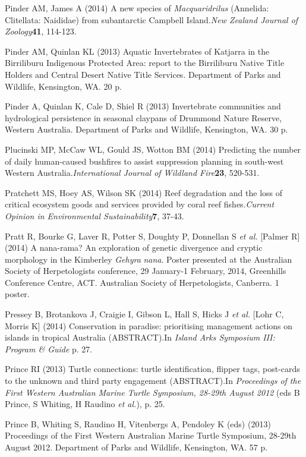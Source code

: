\documentclass[version=last, paper=a4, DIV=18, usenames, dvipsnames]{scrartcl}
\begin{document}
Pinder AM, James A (2014) A new species of \emph{Macquaridrilus} (Annelida: Clitellata: Naididae) from subantarctic Campbell Island.\emph{New Zealand Journal of Zoology}\textbf{41}, 114-123.


Pinder AM, Quinlan KL (2013) Aquatic Invertebrates of Katjarra in the Birriliburu Indigenous Protected Area: report to the Birriliburu Native Title Holders and Central Desert Native Title Services. Department of Parks and Wildlife, Kensington, WA. 20 p.


Pinder A, Quinlan K, Cale D, Shiel R (2013) Invertebrate communities and hydrological persistence in seasonal claypans of Drummond Nature Reserve, Western Australia. Department of Parks and Wildlife, Kensington, WA. 30 p.


Plucinski MP, McCaw WL, Gould JS, Wotton BM (2014) Predicting the number of daily human-caused bushfires to assist suppression planning in south-west Western Australia.\emph{International Journal of Wildland Fire}\textbf{23}, 520-531.


Pratchett MS, Hoey AS, Wilson SK (2014) Reef degradation and the loss of critical ecosystem goods and services provided by coral reef fishes.\emph{Current Opinion in Environmental Sustainability}\textbf{7}, 37-43.


Pratt R, Bourke G, Laver R, Potter S, Doughty P, Donnellan S \emph{et al.} [Palmer R] (2014) A nana-rama? An exploration of genetic divergence and cryptic morphology in the Kimberley \emph{Gehyra} \emph{nana}. Poster presented at the Australian Society of Herpetologists conference, 29 January-1 February, 2014, Greenhills Conference Centre, ACT. Australian Society of Herpetologists, Canberra. 1 poster.


Pressey B, Brotankova J, Craigie I, Gibson L, Hall S, Hicks J \emph{et al.} [Lohr C, Morris K] (2014) Conservation in paradise: prioritising management actions on islands in tropical Australia (ABSTRACT).In \emph{Island Arks Symposium III: Program \& Guide} p. 27.


Prince RI (2013) Turtle connections: turtle identification, flipper tags, post-cards to the unknown and third party engagement (ABSTRACT).In \emph{Proceedings of the First Western Australian Marine Turtle Symposium, 28-29th August 2012} (eds B Prince, S Whiting, H Raudino \emph{et al.}), p. 25.


Prince B, Whiting S, Raudino H, Vitenbergs A, Pendoley K (eds) (2013) Proceedings of the First Western Australian Marine Turtle Symposium, 28-29th August 2012. Department of Parks and Wildlife, Kensington, WA. 57 p.
\end{document}
